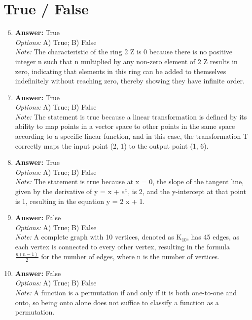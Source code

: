 \documentclass[12pt]{article}
\begin{document}
\section*{True / False}
\begin{enumerate}[label=\arabic*.]
\setcounter{enumi}{5}
\item \textbf{Answer:} True
\\ \textit{Options:} A) True; B) False
\\ \textit{Note:} The characteristic of the ring 2 Z is 0 because there is no positive integer n such that n multiplied by any non-zero element of 2 Z results in zero, indicating that elements in this ring can be added to themselves indefinitely without reaching zero, thereby showing they have infinite order.
\item \textbf{Answer:} True
\\ \textit{Options:} A) True; B) False
\\ \textit{Note:} The statement is true because a linear transformation is defined by its ability to map points in a vector space to other points in the same space according to a specific linear function, and in this case, the transformation T correctly maps the input point (2, 1) to the output point (1, 6).
\item \textbf{Answer:} True
\\ \textit{Options:} A) True; B) False
\\ \textit{Note:} The statement is true because at x = 0, the slope of the tangent line, given by the derivative of y = x + $e^x$, is 2, and the y-intercept at that point is 1, resulting in the equation y = 2 x + 1.
\item \textbf{Answer:} False
\\ \textit{Options:} A) True; B) False
\\ \textit{Note:} A complete graph with 10 vertices, denoted as K$_{10}$, has 45 edges, as each vertex is connected to every other vertex, resulting in the formula \( \frac{n(n-1)}{2} \) for the number of edges, where n is the number of vertices.
\item \textbf{Answer:} False
\\ \textit{Options:} A) True; B) False
\\ \textit{Note:} A function is a permutation if and only if it is both one-to-one and onto, so being onto alone does not suffice to classify a function as a permutation.
\end{enumerate}
\end{document}
